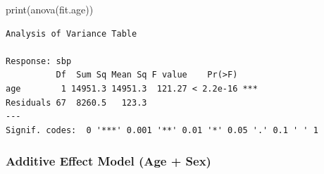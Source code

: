 \documentclass[
  letterpaper,
  DIV=11,
  numbers=noendperiod]{scrreprt}
\newenvironment{Shaded}{\begin{snugshade}}{\end{snugshade}}
\newcommand{\FunctionTok}[1]{\textcolor[rgb]{0.28,0.35,0.67}{#1}}
\newcommand{\NormalTok}[1]{\textcolor[rgb]{0.00,0.23,0.31}{#1}}
\begin{document}
\begin{Shaded}
\begin{Highlighting}[]
\FunctionTok{print}\NormalTok{(}\FunctionTok{anova}\NormalTok{(fit.age))}
\end{Highlighting}
\end{Shaded}

\begin{verbatim}
Analysis of Variance Table

Response: sbp
          Df  Sum Sq Mean Sq F value    Pr(>F)    
age        1 14951.3 14951.3  121.27 < 2.2e-16 ***
Residuals 67  8260.5   123.3                      
---
Signif. codes:  0 '***' 0.001 '**' 0.01 '*' 0.05 '.' 0.1 ' ' 1
\end{verbatim}

\subsubsection{Additive Effect Model (Age +
Sex)}\label{additive-effect-model-age-sex}
\end{document}
